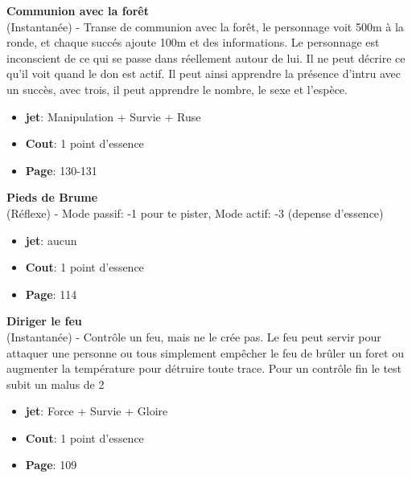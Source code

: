 \documentclass[oneside,12pt]{book}
\newcommand\don[6]{
\textbf{#1} \\
(#6) - #2
\begin{itemize}
\item{ \textbf{jet}: #3}
\item{ \textbf{Cout}: #4}
\item{ \textbf{Page}: #5}
\end{itemize}
\vspace{0.5cm}
}
\begin{document}
\begin{flushleft}
\don{Communion avec la forêt}{Transe de communion avec la forêt, le personnage voit 500m à la ronde, et chaque succés ajoute 100m et des informations. Le personnage est inconscient de ce qui se passe dans réellement autour de lui. Il ne peut décrire ce qu'il voit quand le don est actif. Il peut ainsi apprendre la présence d'intru avec un succès, avec trois, il peut apprendre le nombre, le sexe et l'espèce.}{Manipulation + Survie + Ruse}{1 point d'essence}{130-131}{Instantanée}
\don{Pieds de Brume}{Mode passif: -1 pour te pister, Mode actif: -3 (depense d'essence)}{aucun}{1 point d'essence}{114}{Réflexe}
\don{Diriger le feu}{Contrôle un feu, mais ne le crée pas. Le feu peut servir pour attaquer une personne ou tous simplement empêcher le feu de brûler un foret ou augmenter la température pour détruire toute trace. Pour un contrôle fin le test subit un malus de 2}{Force + Survie + Gloire}{1 point d'essence}{109}{Instantanée}

\clearpage

\end{flushleft}
\end{document}
